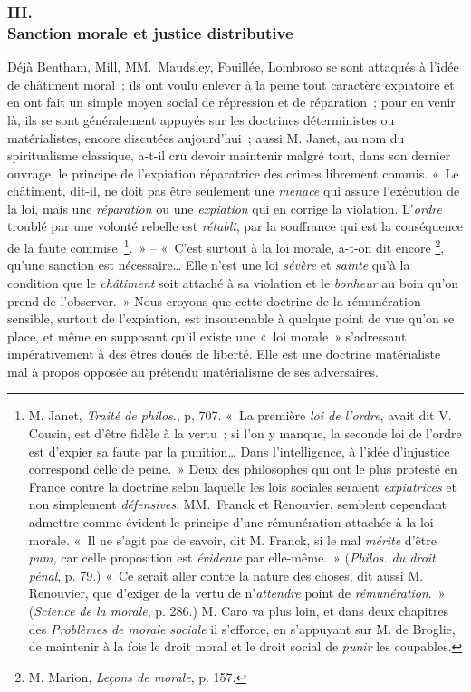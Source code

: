 \documentclass[french,twoside]{book} %
\begin{document}
\subsubsection[{III. Sanction morale et justice distributive}]{III. \\
Sanction morale et justice distributive}
\noindent Déjà Bentham, Mill, MM. Maudsley, Fouillée, Lombroso se sont attaqués à l’idée de châtiment moral ; ils ont voulu enlever à la peine tout caractère expiatoire et en ont fait un simple moyen social de répression et de réparation ; pour en venir là, ils se sont généralement appuyés sur les doctrines déterministes ou matérialistes, encore discutées aujourd’hui ; aussi M. Janet, au nom du spiritualisme classique, a-t-il cru devoir maintenir malgré tout, dans son dernier ouvrage, le principe de l’expiation réparatrice des crimes librement commis. « Le châtiment, dit-il, ne doit pas être seulement une \emph{menace} qui assure l’exécution de la loi, mais une \emph{réparation} ou une \emph{expiation} qui en corrige la violation. L’\emph{ordre} troublé par une volonté rebelle est \emph{rétabli}, par la souffrance qui est la conséquence de la faute commise \footnote{M. Janet, \emph{Traité de philos}., p, 707. « La première \emph{loi de l’ordre}, avait dit V. Cousin, est d’être fidèle à la vertu ; si l’on y manque, la seconde loi de l’ordre est d’expier sa faute par la punition… Dans l’intelligence, à l’idée d’injustice correspond celle de peine. » Deux des philosophes qui ont le plus protesté en France contre la doctrine selon laquelle les lois sociales seraient \emph{expiatrices} et non simplement \emph{défensives}, MM. Franck et Renouvier, semblent cependant admettre comme évident le principe d’une rémunération attachée à la loi morale. « Il ne s’agit pas de savoir, dit M. Franck, si le mal \emph{mérite} d’être \emph{puni}, car celle proposition est \emph{évidente} par elle-même. » (\emph{Philos. du droit pénal}, p. 79.) « Ce serait aller contre la nature des choses, dit aussi M. Renouvier, que d’exiger de la vertu de n’\emph{attendre} point de \emph{rémunération}. » (\emph{Science de la morale}, p. 286.) M. Caro va plus loin, et dans deux chapitres des \emph{Problèmes de morale sociale} il s’efforce, en s’appuyant sur M. de Broglie, de maintenir à la fois le droit moral et le droit social de \emph{punir} les coupables.}. » – « C’est surtout à la loi morale, a-t-on dit encore \footnote{M. Marion, \emph{Leçons de morale}, p. 157.}, qu’une sanction est nécessaire… Elle n’est une loi \emph{sévère} et \emph{sainte} qu’à la condition que le \emph{châtiment} soit attaché à sa violation et le \emph{bonheur} au boin qu’on prend de l’observer. » Nous croyons que cette doctrine de la rémunération sensible, surtout de l’expiation, est insoutenable à quelque point de vue qu’on se place, et même en supposant qu’il existe une « loi morale » s’adressant impérativement à des êtres doués de liberté. Elle est une doctrine matérialiste mal à propos opposée au prétendu matérialisme de ses adversaires.\par
\end{document}
